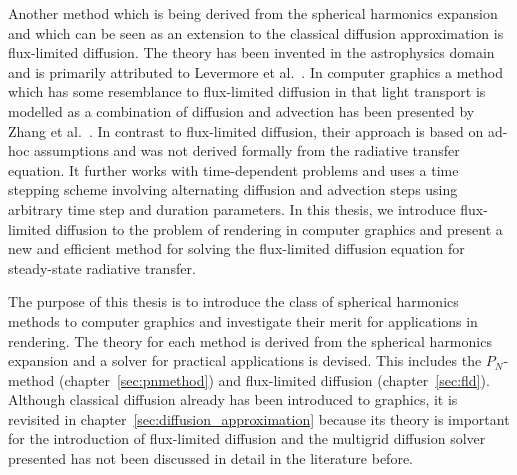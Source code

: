 Another method which is being derived from the spherical harmonics expansion and which can be seen as an extension to the classical diffusion approximation is flux-limited diffusion. The theory has been invented in the astrophysics domain and is primarily attributed to Levermore et al.~\cite{Levermore81}. In computer graphics a method which has some resemblance to flux-limited diffusion in that light transport is modelled as a combination of diffusion and advection has been presented by Zhang et al.~\cite{Zhang13}. In contrast to flux-limited diffusion, their approach is based on ad-hoc assumptions and was not derived formally from the radiative transfer equation. It further works with time-dependent problems and uses a time stepping scheme involving alternating diffusion and advection steps using arbitrary time step and duration parameters. In this thesis, we introduce flux-limited diffusion to the problem of rendering in computer graphics and present a new and efficient method for solving the flux-limited diffusion equation for steady-state radiative transfer.

The purpose of this thesis is to introduce the class of spherical harmonics methods to computer graphics and investigate their merit for applications in rendering. The theory for each method is derived from the spherical harmonics expansion and a solver for practical applications is devised. This includes the $P_N$-method (chapter~\ref{sec:pnmethod}) and flux-limited diffusion (chapter~\ref{sec:fld}). Although classical diffusion already has been introduced to graphics, it is revisited in chapter~\ref{sec:diffusion_approximation} because its theory is important for the introduction of flux-limited diffusion and the multigrid diffusion solver presented has not been discussed in detail in the literature before.

